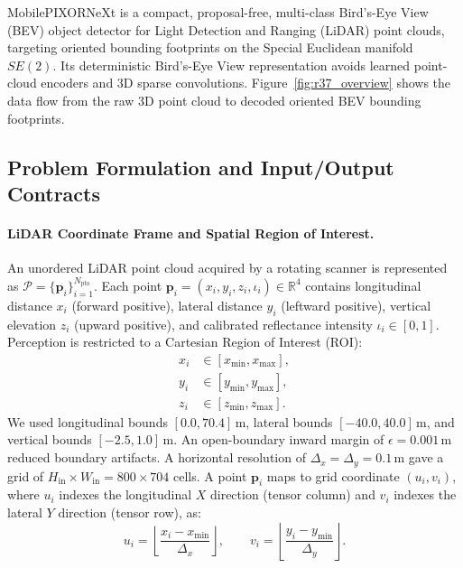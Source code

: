 
MobilePIXORNeXt is a compact, proposal-free, multi-class Bird's-Eye View (BEV) object detector for Light Detection and Ranging (LiDAR) point clouds, targeting oriented bounding footprints on the Special Euclidean manifold $SE(2)$. Its deterministic Bird's-Eye View representation avoids learned point-cloud encoders and 3D sparse convolutions. Figure~\ref{fig:r37_overview} shows the data flow from the raw 3D point cloud to decoded oriented BEV bounding footprints.

\par\vspace{-0.5\baselineskip}
\subsection{Problem Formulation and Input/Output Contracts}
\label{sec:problem_formulation}

\paragraph{LiDAR Coordinate Frame and Spatial Region of Interest.}
An unordered LiDAR point cloud acquired by a rotating scanner is represented as $\mathcal{P} = \{\mathbf{p}_i\}_{i=1}^{N_{\mathrm{pts}}}$. Each point $\mathbf{p}_i = (x_i, y_i, z_i, \iota_i) \in \mathbb{R}^4$ contains longitudinal distance $x_i$ (forward positive), lateral distance $y_i$ (leftward positive), vertical elevation $z_i$ (upward positive), and calibrated reflectance intensity $\iota_i \in [0, 1]$. Perception is restricted to a Cartesian Region of Interest (ROI):
\begin{equation}
    \begin{aligned}
        x_i &\in [x_{\min}, x_{\max}], \\
        y_i &\in [y_{\min}, y_{\max}], \\  z_i &\in [z_{\min}, z_{\max}].
    \end{aligned}
    \label{eq:spatial_roi}
\end{equation}
We used longitudinal bounds $[0.0, 70.4]$\,m, lateral bounds $[-40.0, 40.0]$\,m, and vertical bounds $[-2.5, 1.0]$\,m. An open-boundary inward margin of $\epsilon = 0.001$\,m reduced boundary artifacts. A horizontal resolution of $\Delta_x = \Delta_y = 0.1$\,m gave a grid of $H_{\mathrm{in}} \times W_{\mathrm{in}} = 800 \times 704$ cells. A point $\mathbf{p}_i$ maps to grid coordinate $(u_i, v_i)$, where $u_i$ indexes the longitudinal $X$ direction (tensor column) and $v_i$ indexes the lateral $Y$ direction (tensor row), as:
\begin{equation}
    u_i = \left\lfloor \frac{x_i - x_{\min}}{\Delta_x} \right\rfloor, \qquad v_i = \left\lfloor \frac{y_i - y_{\min}}{\Delta_y} \right\rfloor.
    \label{eq:grid_assignment}
\end{equation}

